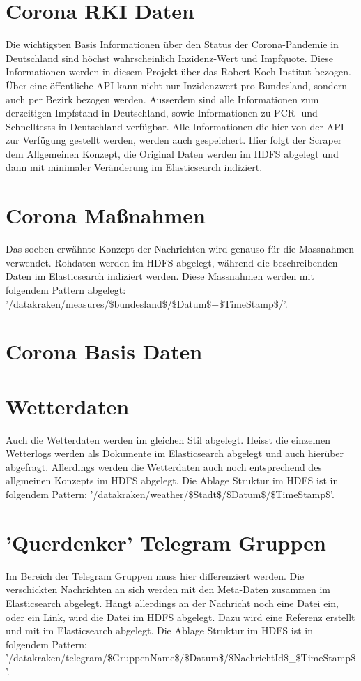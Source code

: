 \documentclass[12pt,oneside,a4paper,parskip]{scrbook}
\begin{document}
\section{Corona RKI Daten}
Die wichtigsten Basis Informationen \"uber den Status der Corona-Pandemie in Deutschland sind h\"ochst wahrscheinlich Inzidenz-Wert und Impfquote. Diese Informationen werden in diesem Projekt \"uber das Robert-Koch-Institut bezogen. \"Uber eine \"offentliche API kann nicht nur Inzidenzwert pro Bundesland, sondern auch per Bezirk bezogen werden. Ausserdem sind alle Informationen zum derzeitigen Impfstand in Deutschland, sowie Informationen zu PCR- und Schnelltests in Deutschland verf\"ugbar. Alle Informationen die hier von der API zur Verf\"ugung gestellt werden, werden auch gespeichert. Hier folgt der Scraper dem Allgemeinen Konzept, die Original Daten werden im HDFS abgelegt und dann mit minimaler Ver\"anderung im Elasticsearch indiziert.
\section{Corona Maßnahmen}
Das soeben erw\"ahnte Konzept der Nachrichten wird genauso f\"ur die Massnahmen verwendet. Rohdaten werden im HDFS abgelegt, w\"ahrend die beschreibenden Daten im Elasticsearch indiziert werden. Diese Massnahmen werden mit folgendem Pattern abgelegt: '/datakraken/measures/\$bundesland\$/\$Datum\$+\$TimeStamp\$/'.
\section{Corona Basis Daten}
\section{Wetterdaten}
Auch die Wetterdaten werden im gleichen Stil abgelegt. Heisst die einzelnen Wetterlogs werden als Dokumente im Elasticsearch abgelegt und auch hier\"uber abgefragt. Allerdings werden die Wetterdaten auch noch entsprechend des allgmeinen Konzepts im HDFS abgelegt. Die Ablage Struktur im HDFS ist in folgendem Pattern:  '/datakraken/weather/\$Stadt\$/\$Datum\$/\$TimeStamp\$'.
\section{'Querdenker' Telegram Gruppen}
Im Bereich der Telegram Gruppen muss hier differenziert werden. Die verschickten Nachrichten an sich werden mit den Meta-Daten zusammen im Elasticsearch abgelegt. H\"angt allerdings an der Nachricht noch eine Datei ein, oder ein Link, wird die Datei im HDFS abgelegt. Dazu wird eine Referenz erstellt und mit im Elasticsearch abgelegt. Die Ablage Struktur im HDFS ist in folgendem Pattern: '/datakraken/telegram/\$GruppenName\$/\$Datum\$/\$NachrichtId\$\_\$TimeStamp\$'.
\end{document}
